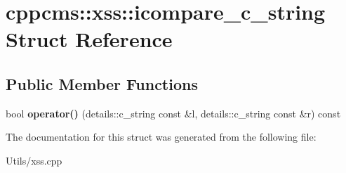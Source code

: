 \hypertarget{structcppcms_1_1xss_1_1icompare__c__string}{\section{cppcms\-:\-:xss\-:\-:icompare\-\_\-c\-\_\-string Struct Reference}
\label{structcppcms_1_1xss_1_1icompare__c__string}
}
\subsection*{Public Member Functions}
\begin{DoxyCompactItemize}
\item 
\hypertarget{structcppcms_1_1xss_1_1icompare__c__string_a4b47e8d8288990c2c1b255c16c2bcd79}{bool {\bfseries operator()} (details\-::c\-\_\-string const \&l, details\-::c\-\_\-string const \&r) const }\label{structcppcms_1_1xss_1_1icompare__c__string_a4b47e8d8288990c2c1b255c16c2bcd79}

\end{DoxyCompactItemize}


The documentation for this struct was generated from the following file\-:\begin{DoxyCompactItemize}
\item 
Utils/xss.\-cpp\end{DoxyCompactItemize}
